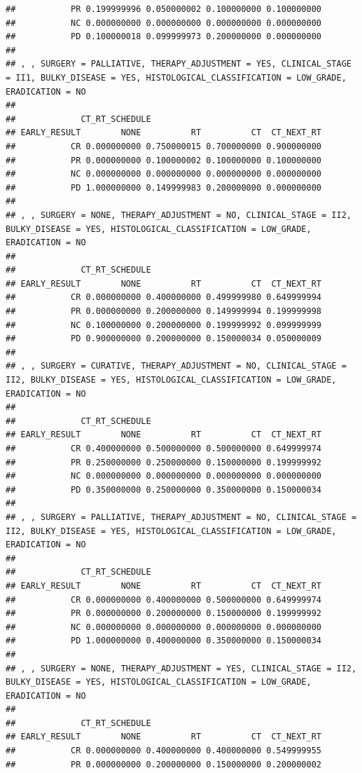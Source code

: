 \documentclass[]{article}
\begin{document}
\begin{verbatim}
##           PR 0.199999996 0.050000002 0.100000000 0.100000000
##           NC 0.000000000 0.000000000 0.000000000 0.000000000
##           PD 0.100000018 0.099999973 0.200000000 0.000000000
## 
## , , SURGERY = PALLIATIVE, THERAPY_ADJUSTMENT = YES, CLINICAL_STAGE = II1, BULKY_DISEASE = YES, HISTOLOGICAL_CLASSIFICATION = LOW_GRADE, ERADICATION = NO
## 
##             CT_RT_SCHEDULE
## EARLY_RESULT        NONE          RT          CT  CT_NEXT_RT
##           CR 0.000000000 0.750000015 0.700000000 0.900000000
##           PR 0.000000000 0.100000002 0.100000000 0.100000000
##           NC 0.000000000 0.000000000 0.000000000 0.000000000
##           PD 1.000000000 0.149999983 0.200000000 0.000000000
## 
## , , SURGERY = NONE, THERAPY_ADJUSTMENT = NO, CLINICAL_STAGE = II2, BULKY_DISEASE = YES, HISTOLOGICAL_CLASSIFICATION = LOW_GRADE, ERADICATION = NO
## 
##             CT_RT_SCHEDULE
## EARLY_RESULT        NONE          RT          CT  CT_NEXT_RT
##           CR 0.000000000 0.400000000 0.499999980 0.649999994
##           PR 0.000000000 0.200000000 0.149999994 0.199999998
##           NC 0.100000000 0.200000000 0.199999992 0.099999999
##           PD 0.900000000 0.200000000 0.150000034 0.050000009
## 
## , , SURGERY = CURATIVE, THERAPY_ADJUSTMENT = NO, CLINICAL_STAGE = II2, BULKY_DISEASE = YES, HISTOLOGICAL_CLASSIFICATION = LOW_GRADE, ERADICATION = NO
## 
##             CT_RT_SCHEDULE
## EARLY_RESULT        NONE          RT          CT  CT_NEXT_RT
##           CR 0.400000000 0.500000000 0.500000000 0.649999974
##           PR 0.250000000 0.250000000 0.150000000 0.199999992
##           NC 0.000000000 0.000000000 0.000000000 0.000000000
##           PD 0.350000000 0.250000000 0.350000000 0.150000034
## 
## , , SURGERY = PALLIATIVE, THERAPY_ADJUSTMENT = NO, CLINICAL_STAGE = II2, BULKY_DISEASE = YES, HISTOLOGICAL_CLASSIFICATION = LOW_GRADE, ERADICATION = NO
## 
##             CT_RT_SCHEDULE
## EARLY_RESULT        NONE          RT          CT  CT_NEXT_RT
##           CR 0.000000000 0.400000000 0.500000000 0.649999974
##           PR 0.000000000 0.200000000 0.150000000 0.199999992
##           NC 0.000000000 0.000000000 0.000000000 0.000000000
##           PD 1.000000000 0.400000000 0.350000000 0.150000034
## 
## , , SURGERY = NONE, THERAPY_ADJUSTMENT = YES, CLINICAL_STAGE = II2, BULKY_DISEASE = YES, HISTOLOGICAL_CLASSIFICATION = LOW_GRADE, ERADICATION = NO
## 
##             CT_RT_SCHEDULE
## EARLY_RESULT        NONE          RT          CT  CT_NEXT_RT
##           CR 0.000000000 0.400000000 0.400000000 0.549999955
##           PR 0.000000000 0.200000000 0.150000000 0.200000002

\end{verbatim}
\end{document}
